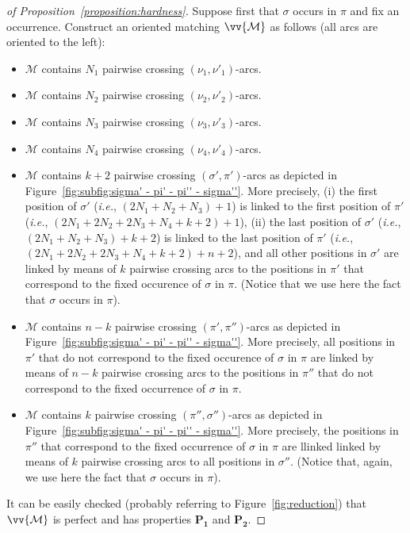 \documentclass[a4paper]{llncs}
\begin{document}
\begin{proof}[of Proposition~\ref{proposition:hardness}]
  Suppose first that $\sigma$ occurs in $\pi$ and fix an occurrence.
  Construct an oriented matching $\vv{\mathcal{M}}$ as follows
  (all arcs are oriented to the left):
  \begin{itemize}
    \item $\mathcal{M}$ contains $N_1$ pairwise crossing
    $(\nu_1, \nu'_1)$-arcs.
    \item $\mathcal{M}$ contains $N_2$ pairwise crossing
    $(\nu_2, \nu'_2)$-arcs.
    \item $\mathcal{M}$ contains $N_3$ pairwise crossing
    $(\nu_3, \nu'_3)$-arcs.
    \item $\mathcal{M}$ contains $N_4$ pairwise crossing
    $(\nu_4, \nu'_4)$-arcs.
    \item $\mathcal{M}$ contains $k+2$ pairwise crossing
    $(\sigma', \pi')$-arcs as depicted in
    Figure~\ref{fig:subfig:sigma' - pi' - pi'' - sigma''}.
    More precisely,
    (i) the first position of $\sigma'$
    (\emph{i.e.}, $(2N_1+N_2+N_3) + 1$) is linked
    to the first position of $\pi'$
    (\emph{i.e.}, $(2N_1 + 2N_2 + 2N_3 + N_4 + k + 2) + 1$),
    (ii) the last position of $\sigma'$
    (\emph{i.e.}, $(2N_1+N_2+N_3) + k+2$) is linked
    to the last position of $\pi'$
    (\emph{i.e.}, $(2N_1 + 2N_2 + 2N_3 + N_4 + k + 2) + n+2$),
    and all other positions in $\sigma'$ are linked by means of $k$ pairwise
    crossing arcs to the positions in
    $\pi'$ that correspond to the fixed occurence of $\sigma$ in $\pi$.
    (Notice that we use here the fact that $\sigma$ occurs in $\pi$).
    \item $\mathcal{M}$ contains $n-k$ pairwise crossing
    $(\pi', \pi'')$-arcs as depicted in
    Figure~\ref{fig:subfig:sigma' - pi' - pi'' - sigma''}.
    More precisely,
    all positions in $\pi'$ that do not correspond to the fixed occurence of
    $\sigma$ in $\pi$ are linked by means of $n-k$ pairwise crossing arcs
    to the positions in $\pi''$ that do not correspond to the fixed
    occurrence of $\sigma$ in $\pi$.
    \item $\mathcal{M}$ contains $k$ pairwise crossing
    $(\pi'', \sigma'')$-arcs as depicted in
    Figure~\ref{fig:subfig:sigma' - pi' - pi'' - sigma''}.
    More precisely, the positions in $\pi''$ that correspond to
    the fixed occurrence of $\sigma$ in $\pi$ are llinked
    linked by means of $k$ pairwise crossing arcs to all positions in
    $\sigma''$.
    (Notice that, again, we use here the fact that $\sigma$ occurs in $\pi$).
  \end{itemize}
  It can be easily checked (probably referring to Figure~\ref{fig:reduction}) that
  $\vv{\mathcal{M}}$ is perfect and has
  properties $\mathbf{P_1}$ and $\mathbf{P_2}$.


\end{proof}
\end{document}
